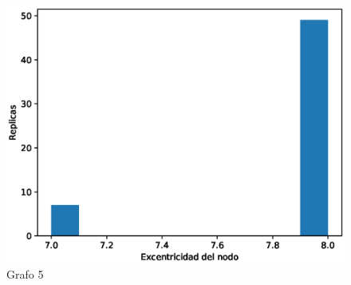 \documentclass{article}
\begin{document}
\begin{figure}[H]
    \includegraphics[scale=0.6]{hist-centralidad-5}
    \caption{Grafo 5}
    \label{fig:matriz}
\end{figure}
\end{document}
